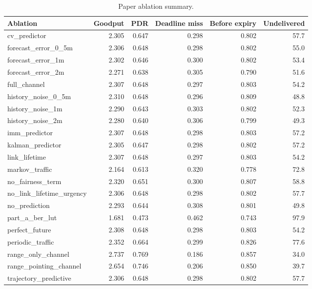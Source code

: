 \begin{table}[t]
\centering
\caption{Paper ablation summary.}
\begin{tabular}{lrrrrr}
\toprule
Ablation & Goodput & PDR & Deadline miss & Before expiry & Undelivered \\
\midrule
cv\_predictor & 2.305 & 0.647 & 0.298 & 0.802 & 57.7 \\
forecast\_error\_0\_5m & 2.306 & 0.648 & 0.298 & 0.802 & 55.0 \\
forecast\_error\_1m & 2.302 & 0.646 & 0.300 & 0.802 & 53.4 \\
forecast\_error\_2m & 2.271 & 0.638 & 0.305 & 0.790 & 51.6 \\
full\_channel & 2.307 & 0.648 & 0.297 & 0.803 & 54.2 \\
history\_noise\_0\_5m & 2.310 & 0.648 & 0.296 & 0.809 & 48.8 \\
history\_noise\_1m & 2.290 & 0.643 & 0.303 & 0.802 & 52.3 \\
history\_noise\_2m & 2.280 & 0.640 & 0.306 & 0.799 & 49.3 \\
imm\_predictor & 2.307 & 0.648 & 0.298 & 0.803 & 57.2 \\
kalman\_predictor & 2.305 & 0.647 & 0.298 & 0.802 & 57.2 \\
link\_lifetime & 2.307 & 0.648 & 0.297 & 0.803 & 54.2 \\
markov\_traffic & 2.164 & 0.613 & 0.320 & 0.778 & 72.8 \\
no\_fairness\_term & 2.320 & 0.651 & 0.300 & 0.807 & 58.8 \\
no\_link\_lifetime\_urgency & 2.306 & 0.648 & 0.298 & 0.802 & 57.7 \\
no\_prediction & 2.293 & 0.644 & 0.308 & 0.801 & 49.8 \\
part\_a\_ber\_lut & 1.681 & 0.473 & 0.462 & 0.743 & 97.9 \\
perfect\_future & 2.308 & 0.648 & 0.298 & 0.803 & 54.2 \\
periodic\_traffic & 2.352 & 0.664 & 0.299 & 0.826 & 77.6 \\
range\_only\_channel & 2.737 & 0.769 & 0.186 & 0.857 & 34.0 \\
range\_pointing\_channel & 2.654 & 0.746 & 0.206 & 0.850 & 39.7 \\
trajectory\_predictive & 2.306 & 0.648 & 0.298 & 0.802 & 57.7 \\
\bottomrule
\end{tabular}
\end{table}
